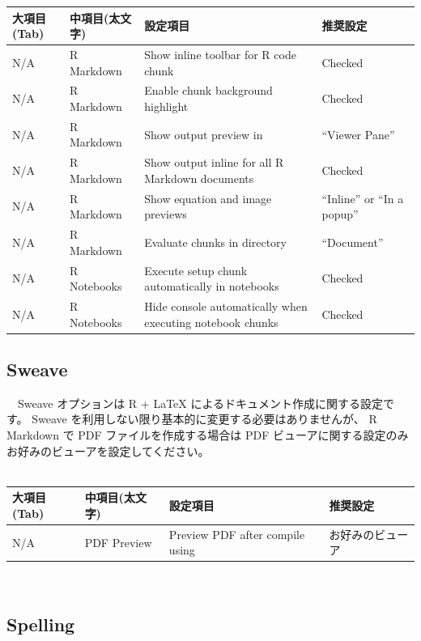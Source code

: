 \documentclass[
  12pt,
]{book}
\begin{document}
\begin{longtable}[]{@{}
  >{\raggedright\arraybackslash}p{}
  >{\raggedright\arraybackslash}p{}
  >{\raggedright\arraybackslash}p{}
  >{\raggedright\arraybackslash}p{}@{}}
\toprule
大項目(Tab) & 中項目(太文字) & 設定項目 & 推奨設定 \\
\midrule
\endhead
N/A & R Markdown & Show inline toolbar for R code chunk & Checked \\
N/A & R Markdown & Enable chunk background highlight & Checked \\
N/A & R Markdown & Show output preview in & ``Viewer Pane'' \\
N/A & R Markdown & Show output inline for all R Markdown documents & Checked \\
N/A & R Markdown & Show equation and image previews & ``Inline'' or ``In a popup'' \\
N/A & R Markdown & Evaluate chunks in directory & ``Document'' \\
N/A & R Notebooks & Execute setup chunk automatically in notebooks & Checked \\
N/A & R Notebooks & Hide console automatically when executing notebook chunks & Checked \\
\bottomrule
\end{longtable}

\hypertarget{sweave}{%
\subsection{Sweave}\label{sweave}}

　Sweave オプションは R + LaTeX によるドキュメント作成に関する設定です。 Sweave を利用しない限り基本的に変更する必要はありませんが、 R Markdown で PDF ファイルを作成する場合は PDF ビューアに関する設定のみお好みのビューアを設定してください。\\
　

\begin{longtable}[]{@{}llll@{}}
\toprule
大項目(Tab) & 中項目(太文字) & 設定項目 & 推奨設定 \\
\midrule
\endhead
N/A & PDF Preview & Preview PDF after compile using & お好みのビューア \\
\bottomrule
\end{longtable}

　

\hypertarget{spelling}{%
\subsection{Spelling}\label{spelling}}
\end{document}
